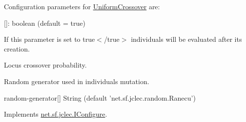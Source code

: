 Configuration parameters for \hyperlink{classnet_1_1sf_1_1jclec_1_1intarray_1_1rec_1_1_uniform_crossover}{Uniform\-Crossover} are\-:


\begin{DoxyItemize}
\item {\ttfamily \mbox{[}\mbox{]}\-: boolean (default = true)}

If this parameter is set to {\ttfamily true$<$/true$>$ individuals will be evaluated after its creation.  }
\item {}

{\ttfamily  Locus crossover probability.  }
\item {}

{\ttfamily  Random generator used in individuals mutation. 
\begin{DoxyItemize}
\item {\ttfamily random-\/generator\mbox{[}\mbox{]} String (default 'net.\-sf.\-jclec.\-random.\-Ranecu')}  
\end{DoxyItemize}}
\end{DoxyItemize}

Implements \hyperlink{interfacenet_1_1sf_1_1jclec_1_1_i_configure_add31a65a04d148c690a956fbbad6987c}{net.\-sf.\-jclec.\-I\-Configure}.

